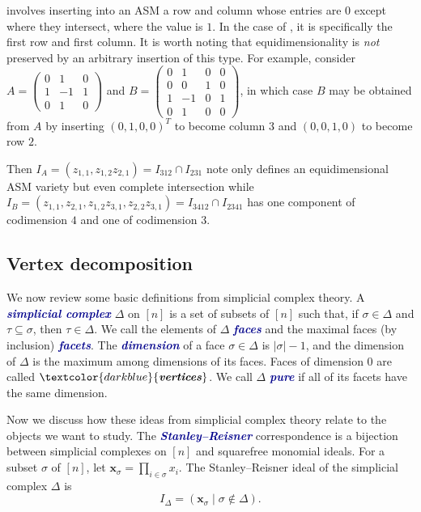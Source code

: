 \documentclass[12 pt]{amsart}
\theoremstyle{plain}
\newenvironment{example}
  {\pushQED{\qed}\renewcommand{\qedsymbol}{$\diamondsuit$}\examplex}
  {\popQED\endexamplex}
\theoremstyle{definition}
\theoremstyle{remark}
\newcommand{\newword}[1]{\textcolor{darkblue}{\textbf{\emph{#1}}}}
\begin{document}
\begin{example}\label{ex:permBij}
  involves inserting into an ASM a row and column whose entries are $0$ except where they intersect, where the value is $1$. In the case of , it is specifically the first row and first column.  It is worth noting that equidimensionality is \emph{not} preserved by an arbitrary insertion of this type.  For example, consider $A = \begin{pmatrix}
0 & 1 & 0 \\
1 & -1 & 1 \\
0 & 1 &  0
\end{pmatrix}$ and $B = \begin{pmatrix}
0 & 1 & 0 & 0 \\
0 & 0 & 1 & 0 \\
1 & -1 & 0 & 1 \\
0 & 1 & 0 & 0
\end{pmatrix}$, in which case $B$ may be obtained from $A$ by inserting $(0,1,0,0)^T$ to become column $3$ and $(0,0,1,0)$ to become row $2$.

Then $I_A = (z_{1,1}, z_{1,2}z_{2,1}) = I_{312} \cap I_{231}$ note only defines an equidimensional ASM variety but even complete intersection while $I_B = (z_{1,1}, z_{2,1}, z_{1,2}z_{3,1}, z_{2,2}z_{3,1}) = I_{3412} \cap I_{2341}$ has one component of codimension $4$ and one of codimension $3$.  
\end{example}



\subsection{Vertex decomposition} 


We now review some basic definitions from simplicial complex theory.  A \newword{simplicial complex} $\Delta$ on $[n]$ is a set of subsets of $[n]$ such that, if $\sigma \in \Delta$ and $\tau \subseteq \sigma$, then $\tau \in \Delta$.  We call the elements of $\Delta$ \newword{faces} and the maximal faces (by inclusion) \newword{facets}.  The \newword{dimension} of a face $\sigma \in \Delta$ is $|\sigma|-1$, and the dimension of $\Delta$ is the maximum among dimensions of its faces.  Faces of dimension $0$ are called $\newword{vertices}$.  We call $\Delta$ \newword{pure} if all of its facets have the same dimension.

Now we discuss how these ideas from simplicial complex theory relate to the objects we want to study. The \newword{Stanley--Reisner} correspondence is a bijection between simplicial complexes on $[n]$ and squarefree monomial ideals. For a subset $\sigma$ of $[n]$, let $\mathbf{x}_\sigma = \prod_{i \in \sigma} x_i$. The Stanley--Reisner ideal of the simplicial complex $\Delta$ is 
\[
    I_{\Delta} = (\mathbf{x}_{\sigma} \mid \sigma \notin \Delta).
\]
\end{document}
